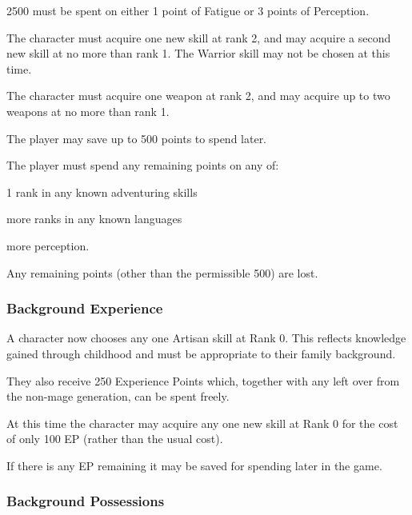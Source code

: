 \begin{multicols*}{3}
\begin{Enumerate}
\item
2500 must be spent on either 1 point of Fatigue or 3 points of
Perception.

\item
The character must acquire one new skill at rank 2, and may acquire a
second new skill at no more than rank 1. The Warrior skill may not be
chosen at this time.

\item
The character must acquire one weapon at rank 2, and may acquire up to
two weapons at no more than rank 1.

\item
The player may save up to 500 points to spend later.

\end{Enumerate}

The player must spend any remaining points on any of:
\begin{Itemize}
\item
1 rank in any known adventuring skills

\item
more ranks in any known languages

\item
more perception.
\end{Itemize}

Any remaining points (other than the permissible 500) are lost.

\subsubsection{Background Experience}

A character now chooses any one Artisan skill at Rank 0. This reflects
knowledge gained through childhood and must be appropriate to their
family background.

They also receive 250 Experience Points which, together with any left
over from the non-mage generation, can be spent freely.

At this time the character may acquire any one new skill at Rank 0 for
the cost of only 100 EP (rather than the usual cost).

If there is any EP remaining it may be saved for spending later in the
game.

\subsubsection{Background Possessions}


\end{multicols*}
